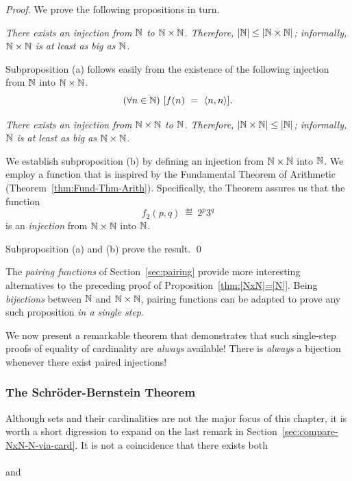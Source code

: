 \begin{proof}
We prove the following propositions in turn.

\medskip

 {\em There exists an injection from $\N$ to $\N
  \times \N$.  Therefore, $|\mathbb{N}| \leq |\mathbb{N} \times \mathbb{N}|$; informally, $\N
  \times \N$ is at least as big as $\N$.}

\smallskip

\noindent
Subproposition (a) follows easily from the existence of the following
injection from $\N$ into $\N \times \N$.
\[ (\forall n \in \mathbb{N}) \ [ f(n) \ = \ \langle n,n \rangle]. \]

\medskip

 {\em There exists an injection from $\N \times \N$
  to $\N$.  Therefore, $|\mathbb{N} \times \mathbb{N}| \leq |\mathbb{N}|$; informally, $\N$ is
  at least as big as $\N \times \N$.}

\smallskip

\noindent
We establish subproposition (b) by defining an injection from $\N
\times \N$ into $\N$.  We employ a function that is inspired by the
Fundamental Theorem of Arithmetic (Theorem~\ref{thm:Fund-Thm-Arith}).
Specifically, the Theorem assures us that the function
\[ f_2(p,q) \ \eqdef \ 2^p 3^q \]
is an {\em injection} from $\N \times \N$ into $\N$.

Subproposition (a) and (b) prove the result.  \qed
\end{proof}

\medskip

The {\it pairing functions} of Section~\ref{sec:pairing} provide more
interesting alternatives to the preceding proof of
Proposition~\ref{thm:|NxN|=|N|}.  Being {\em bijections} between $\N$
and $\N \times \N$, pairing functions can be adapted to prove any such
proposition {\em in a single step}. 

\medskip

We now present a remarkable theorem that demonstrates that such
single-step proofs of equality of cardinality are {\em always}
available!  There is {\em always} a bijection whenever there exist
paired injections!


\subsubsection{The Schr\"{o}der-Bernstein Theorem}
\label{sec:schroeder-bernstein}

Although sets and their cardinalities are not the major focus of this
chapter, it is worth a short digression to expand on the last remark
in Section~\ref{sec:compare-NxN-N-via-card}.  It is not a coincidence
that there exists both \\
\hspace*{.35in}{\em a bijection between $\N$ and $\N \times \N$} \\
and \\
\hspace*{.35in}{\em an injection from $\N$ to $\N \times \N$ and an
  injection from $\N \times \N$ to $\N$.}

